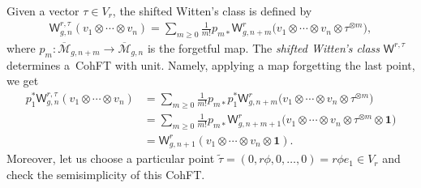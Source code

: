 \documentclass[pdftex]{sigma}
\def\oM{\overline{\mathcal{M}}}
\def\b1{{\mathbf 1}}
\def\W{\mathsf{W}}
\numberwithin{equation}{section}
\begin{document}
\begin{Example}\label{swc}
Given a vector $\tau \in V_r$, the shifted Witten's class is defined by
\begin{align*}
\W_{g,n}^{r,\tau}(v_1 \otimes \cdots \otimes v_n) =
\sum_{m \geq 0}\frac{1}{m!}
p_{m*} \W^r_{g,n+m}\big(v_1 \otimes \cdots \otimes v_n \otimes \tau^{\otimes m}\big),
\end{align*}
where $p_m \colon \oM_{g,n+m} \to \oM_{g,n}$ is the forgetful map.
The \emph{shifted Witten's class} $\W^{r,\tau}$ determines a~CohFT with unit. Namely,
applying a map forgetting the last point, we get
\begin{align*}
p^{*}_1 \W_{g,n}^{r,\tau}(v_1 \otimes \cdots \otimes v_n) &
=\sum_{m \geq 0}\frac{1}{m!}
p_{m*}p^{*}_{1} \W^r_{g,n+m}\big(v_1 \otimes \cdots \otimes v_n \otimes \tau^{\otimes m}\big)\\
&=\sum_{m \geq 0}\frac{1}{m!} p_{m*}\W^r_{g,n+m+1}\big(v_1 \otimes \cdots \otimes v_n \otimes \tau^{\otimes m}\otimes \b1\big)\\
&=\W^r_{g,n+1}(v_1 \otimes \cdots \otimes v_n \otimes \b1).
\end{align*}
Moreover, let us choose a particular point $\widetilde{\tau}=(0,r\phi,0,\dots,0)=r\phi e_1\in V_r$ and check the semisimplicity of this CohFT.


\end{Example}
\end{document}
